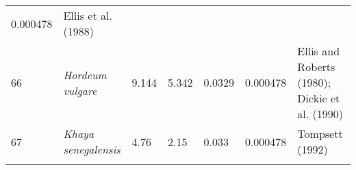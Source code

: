 \documentclass[]{article}
\begin{document}
\begin{longtable}[]{@{}lllllll@{}}
\begin{minipage}[t]{0.08\columnwidth}
0.000478\strut
\end{minipage} & \begin{minipage}[t]{0.23\columnwidth}\raggedright
Ellis et al. (1988)\strut
\end{minipage}\tabularnewline
\begin{minipage}[t]{0.05\columnwidth}\raggedright
66\strut
\end{minipage} & \begin{minipage}[t]{0.23\columnwidth}\raggedright
\emph{Hordeum vulgare}\strut
\end{minipage} & \begin{minipage}[t]{0.05\columnwidth}\raggedright
9.144\strut
\end{minipage} & \begin{minipage}[t]{0.08\columnwidth}\raggedright
5.342\strut
\end{minipage} & \begin{minipage}[t]{0.08\columnwidth}\raggedright
0.0329\strut
\end{minipage} & \begin{minipage}[t]{0.08\columnwidth}\raggedright
0.000478\strut
\end{minipage} & \begin{minipage}[t]{0.23\columnwidth}\raggedright
Ellis and Roberts (1980); Dickie et al. (1990)\strut
\end{minipage}\tabularnewline
\begin{minipage}[t]{0.05\columnwidth}\raggedright
67\strut
\end{minipage} & \begin{minipage}[t]{0.23\columnwidth}\raggedright
\emph{Khaya senegalensis}\strut
\end{minipage} & \begin{minipage}[t]{0.05\columnwidth}\raggedright
4.76\strut
\end{minipage} & \begin{minipage}[t]{0.08\columnwidth}\raggedright
2.15\strut
\end{minipage} & \begin{minipage}[t]{0.08\columnwidth}\raggedright
0.033\strut
\end{minipage} & \begin{minipage}[t]{0.08\columnwidth}\raggedright
0.000478\strut
\end{minipage} & \begin{minipage}[t]{0.23\columnwidth}\raggedright
Tompsett (1992)\strut
\end{minipage}\tabularnewline
\begin{minipage}[t]{0.05\columnwidth}\raggedright

\end{minipage}
\end{longtable}
\end{document}
